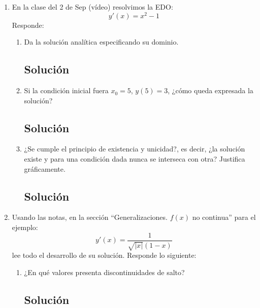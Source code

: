 \begin{enumerate}[label=\arabic*., leftmargin=*]
\begin{enumerate}[label=(\alph*), leftmargin=*]
        \subsection*{Solución}
    \end{enumerate}

    \item En la clase del 2 de Sep (vídeo) resolvimos la EDO:
    \[ y'(x) = x^{2} - 1 \]
    Responde:
    \begin{enumerate}[label=(\alph*), leftmargin=*]
        \item Da la solución analítica especificando su dominio.
        \subsection*{Solución}

        \item Si la condición inicial fuera $x_{0}=5$, $y(5)=3$, ¿cómo queda expresada la solución?
        \subsection*{Solución}

        \item ¿Se cumple el principio de existencia y unicidad?, es decir, ¿la solución existe y para una condición dada nunca se interseca con otra? Justifica gráficamente.
        \subsection*{Solución}
    \end{enumerate}

    \item Usando las notas, en la sección ``Generalizaciones. $f(x)$ no continua'' para el ejemplo:
    \begin{equation*}
        y'(x) = \frac{1}{\sqrt{|x|}(1-x)} \tag{1}
    \end{equation*}
    lee todo el desarrollo de su solución. Responde lo siguiente:
    \begin{enumerate}[label=(\alph*), leftmargin=*]
        \item ¿En qué valores presenta discontinuidades de salto?
        \subsection*{Solución}


\end{enumerate}
\end{enumerate}
